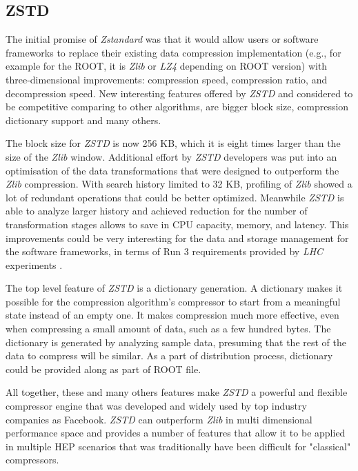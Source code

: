 \documentclass[12pt]{iopart}
\begin{document}
\subsection{ZSTD}

The initial promise of \textit{Zstandard} \cite{zstd} \cite{zstd-facebook} was that it would allow users or software frameworks to replace their existing data compression implementation (e.g., for example for the ROOT, it is \textit{Zlib} or \textit{LZ4} depending on ROOT version) with three-dimensional improvements: compression speed, compression ratio, and decompression speed. New interesting features offered by \textit{ZSTD} and considered to be competitive comparing to other algorithms, are bigger block size, compression dictionary support and many others.

The block size for \textit{ZSTD} is now 256 KB, which it is eight times larger than the size of the \textit{Zlib} window. Additional effort by \textit{ZSTD} developers was put into an optimisation of the data transformations that were designed to outperform the \textit{Zlib} compression.  With search history limited to 32 KB, profiling of \textit{Zlib} showed a lot of redundant operations that could be better optimized. Meanwhile \textit{ZSTD} is able to analyze larger history and  achieved reduction for the number of transformation stages allows to save in CPU capacity, memory, and latency. This improvements could be very interesting for the data and storage management for the software frameworks, in terms of Run 3 requirements provided by \textit{LHC} experiments \cite{zstd-facebook}. 

The top level feature of \textit{ZSTD} is a dictionary generation. A dictionary makes it possible for the compression algorithm's compressor to start from a meaningful state instead of an empty one. It makes compression much more effective, even when compressing a small amount of data, such as a few hundred bytes. The dictionary is generated by analyzing sample data, presuming that the rest of the data to compress will be similar. As a part of distribution process, dictionary could be provided along as part of ROOT file.

All together, these and many others features make \textit{ZSTD} a powerful and flexible compressor engine that was developed and  widely used by top industry companies as Facebook. \textit{ZSTD} can outperform \textit{Zlib} in multi dimensional performance space and provides a number of features that allow it to be applied in multiple HEP scenarios that was traditionally have been difficult for "classical" compressors.
\end{document}

